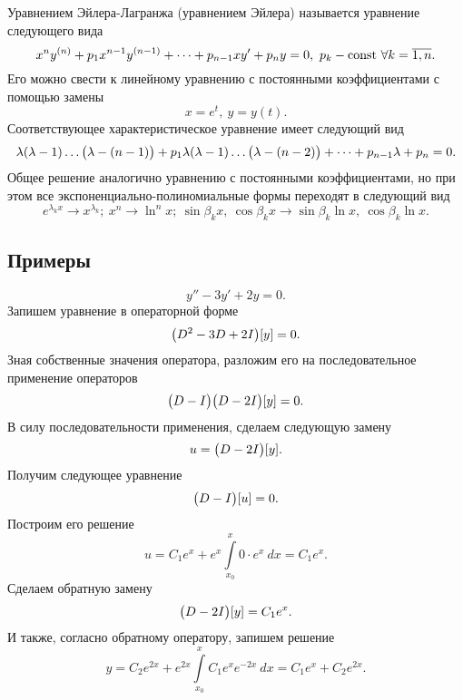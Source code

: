     Уравнением Эйлера-Лагранжа (уравнением Эйлера) называется уравнение следующего вида
    \[
        x^n y^{(n)} + p_1 x^{n - 1} y^{(n - 1)} + \dots + p_{n - 1} x y' + p_n y = 0, ~ p_k - \mathrm{const} ~ \forall k = \overline{1, n}.
    \]
    Его можно свести к линейному уравнению с постоянными коэффициентами с помощью замены
    \[
        x = e^t, ~ y = y(t).
    \]
    Соответствующее характеристическое уравнение имеет следующий вид
    \[
        \lambda(\lambda - 1) \dots \bigl( \lambda - (n - 1) \bigr) + p_1 \lambda(\lambda - 1) \dots \bigl( \lambda - (n - 2) \bigr) + \dots + p_{n - 1} \lambda + p_n = 0.
    \]
    Общее решение аналогично уравнению с постоянными коэффициентами, но при этом все экспоненциально-полиномиальные формы переходят в следующий вид
    \[
        e^{\lambda_k x} \rightarrow x^{\lambda_k}; ~ x^n \rightarrow \ln^n{x}; ~ \sin{\beta_k x}, ~ \cos{\beta_k x} \rightarrow \sin{\beta_k \ln{x}}, ~ \cos{\beta_k \ln{x}}.
    \]

    \subsection{Примеры}

        \[
            y'' - 3y' + 2y = 0.
        \]
        Запишем уравнение в операторной форме
        \[
            \bigl( D^2 - 3D + 2I \bigr)[y] = 0.
        \]
        Зная собственные значения оператора, разложим его на последовательное применение операторов
        \[
            \bigl( D - I \bigr) \bigl( D - 2I \bigr) [y] = 0.
        \]
        В силу последовательности применения, сделаем следующую замену
        \[
            u = \bigl( D - 2I \bigr)[y].
        \]
        Получим следующее уравнение
        \[
            \bigl( D - I \bigr)[u] = 0.
        \]
        Построим его решение
        \[
            u = C_1 e^x + e^x \int\limits^x_{x_0} 0 \cdot e^x ~ dx = C_1 e^x.
        \]
        Сделаем обратную замену
        \[
            \bigl( D - 2I \bigr)[y] = C_1 e^x.
        \]
        И также, согласно обратному оператору, запишем решение
        \[
            y = C_2 e^{2x} + e^{2x} \int\limits^x_{x_0} C_1 e^x e^{-2x} ~ dx = C_1 e^x + C_2 e^{2x}.
        \]

